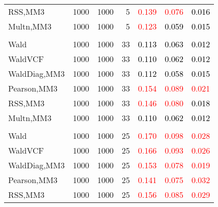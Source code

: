 \documentclass[
]{article}
\begin{document}
\begin{table}[H]
{\begin{tabular}[t]{lrrrrrr}
\hspace{1em}RSS,MM3 & 1000 & 1000 & 5 & \textcolor{red}{0.139} & \textcolor{red}{0.076} & \textcolor{black}{0.016}\\
\hspace{1em}Multn,MM3 & 1000 & 1000 & 5 & \textcolor{red}{0.123} & \textcolor{black}{0.059} & \textcolor{black}{0.015}\\
\addlinespace[0.3em]
\multicolumn{7}{l}{\textbf{1F 15V}}\\
\hspace{1em}Wald & 1000 & 1000 & 33 & \textcolor{black}{0.113} & \textcolor{black}{0.063} & \textcolor{black}{0.012}\\
\hspace{1em}WaldVCF & 1000 & 1000 & 33 & \textcolor{black}{0.110} & \textcolor{black}{0.062} & \textcolor{black}{0.012}\\
\hspace{1em}WaldDiag,MM3 & 1000 & 1000 & 33 & \textcolor{black}{0.112} & \textcolor{black}{0.058} & \textcolor{black}{0.015}\\
\hspace{1em}Pearson,MM3 & 1000 & 1000 & 33 & \textcolor{red}{0.154} & \textcolor{red}{0.089} & \textcolor{red}{0.021}\\
\hspace{1em}RSS,MM3 & 1000 & 1000 & 33 & \textcolor{red}{0.146} & \textcolor{red}{0.080} & \textcolor{black}{0.018}\\
\hspace{1em}Multn,MM3 & 1000 & 1000 & 33 & \textcolor{black}{0.110} & \textcolor{black}{0.062} & \textcolor{black}{0.012}\\
\addlinespace[0.3em]
\multicolumn{7}{l}{\textbf{2F 10V}}\\
\hspace{1em}Wald & 1000 & 1000 & 25 & \textcolor{red}{0.170} & \textcolor{red}{0.098} & \textcolor{red}{0.028}\\
\hspace{1em}WaldVCF & 1000 & 1000 & 25 & \textcolor{red}{0.166} & \textcolor{red}{0.093} & \textcolor{red}{0.026}\\
\hspace{1em}WaldDiag,MM3 & 1000 & 1000 & 25 & \textcolor{red}{0.153} & \textcolor{red}{0.078} & \textcolor{red}{0.019}\\
\hspace{1em}Pearson,MM3 & 1000 & 1000 & 25 & \textcolor{red}{0.141} & \textcolor{red}{0.075} & \textcolor{red}{0.032}\\
\hspace{1em}RSS,MM3 & 1000 & 1000 & 25 & \textcolor{red}{0.156} & \textcolor{red}{0.085} & \textcolor{red}{0.029}\\

\end{tabular}}
\end{table}
\end{document}
